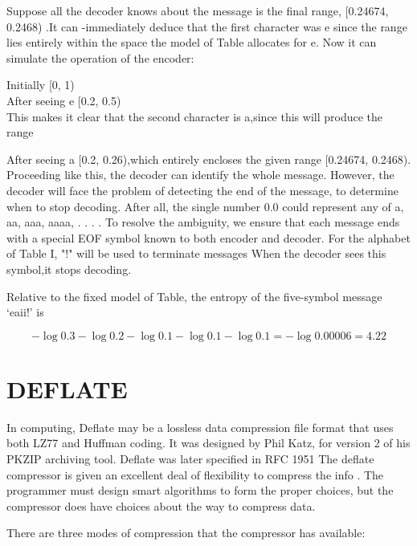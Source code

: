 \documentclass{article}
\begin{document}
Suppose all the decoder knows about the message is the final range, [0.24674, 0.2468) .It can -immediately deduce that the first character was e since the range lies entirely within the space the model of Table allocates for e. Now it can simulate the operation of the encoder:

Initially [0, 1)
\\
After seeing e [0.2, 0.5)
\\

This makes it clear that the second character is a,since this will produce the range

After seeing a [0.2, 0.26),which entirely encloses the given range [0.24674, 0.2468). Proceeding like this, the decoder can identify the whole message. However, the decoder will face the problem of detecting the end of the message, to determine when to stop decoding. After all, the single number 0.0 could represent any of a, aa, aaa, aaaa, . . .  . To resolve the ambiguity, we ensure that each message ends with a special EOF symbol known to both encoder and decoder. For the alphabet of Table I, "!" will be used to terminate messages  When the decoder sees this symbol,it stops decoding. 

Relative to the fixed model of Table, the entropy
of the five-symbol message ‘eaii!’ is 

$$-\log{0.3} - \log{0.2} - \log{0.1} - \log{0.1} - \log{0.1} = -\log{0.00006} =4.22$$



\section{DEFLATE}

In computing, Deflate may be a lossless data compression file format that uses both  LZ77 and Huffman coding. It was designed by Phil Katz, for version 2 of his PKZIP archiving tool. Deflate was later specified in RFC 1951 \cite{deflate}
The deflate compressor is given an excellent deal of flexibility to compress the info . The programmer must design smart algorithms to form the proper choices, but the compressor does have choices about the way to compress data.

There are three modes of compression that the compressor has available:
\end{document}
